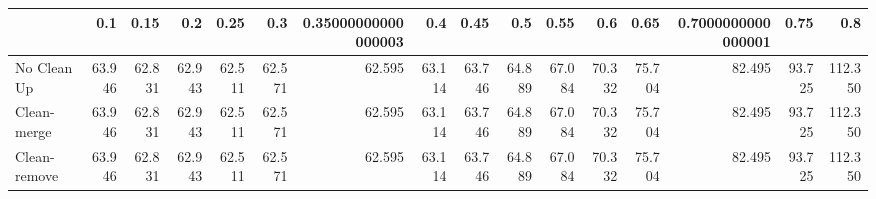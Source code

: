 \begin{tabular}{lrrrrrrrrrrrrrrr}
\toprule
{} &    0.1 &   0.15 &    0.2 &   0.25 &    0.3 & 0.35000000000000003 &    0.4 &   0.45 &    0.5 &   0.55 &    0.6 &   0.65 & 0.7000000000000001 &   0.75 &     0.8 \\
\midrule
No Clean Up  & 63.946 & 62.831 & 62.943 & 62.511 & 62.571 &              62.595 & 63.114 & 63.746 & 64.889 & 67.084 & 70.332 & 75.704 &             82.495 & 93.725 & 112.350 \\
Clean-merge  & 63.946 & 62.831 & 62.943 & 62.511 & 62.571 &              62.595 & 63.114 & 63.746 & 64.889 & 67.084 & 70.332 & 75.704 &             82.495 & 93.725 & 112.350 \\
Clean-remove & 63.946 & 62.831 & 62.943 & 62.511 & 62.571 &              62.595 & 63.114 & 63.746 & 64.889 & 67.084 & 70.332 & 75.704 &             82.495 & 93.725 & 112.350 \\
\bottomrule
\end{tabular}

